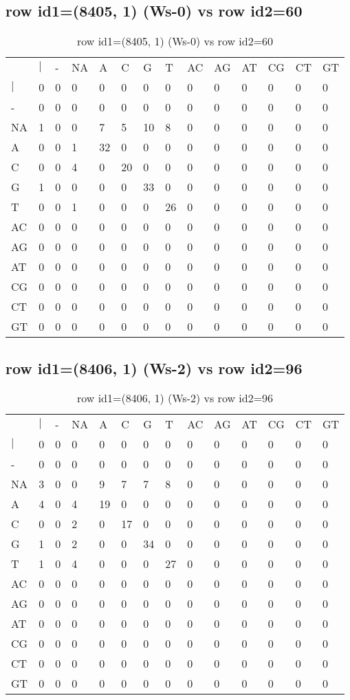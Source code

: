 \subsection{row id1=(8405, 1) (Ws-0) vs row id2=60}
\begin{center}
\begin{longtable}{|l|l|l|l|l|l|l|l|l|l|l|l|l|l|}
\caption{row id1=(8405, 1) (Ws-0) vs row id2=60} \label{table_dm478}\\
\hline
\\
\hline
&$|$&-&NA&A&C&G&T&AC&AG&AT&CG&CT&GT\\
$|$&0&0&0&0&0&0&0&0&0&0&0&0&0\\
-&0&0&0&0&0&0&0&0&0&0&0&0&0\\
NA&1&0&0&7&5&10&8&0&0&0&0&0&0\\
A&0&0&1&32&0&0&0&0&0&0&0&0&0\\
C&0&0&4&0&20&0&0&0&0&0&0&0&0\\
G&1&0&0&0&0&33&0&0&0&0&0&0&0\\
T&0&0&1&0&0&0&26&0&0&0&0&0&0\\
AC&0&0&0&0&0&0&0&0&0&0&0&0&0\\
AG&0&0&0&0&0&0&0&0&0&0&0&0&0\\
AT&0&0&0&0&0&0&0&0&0&0&0&0&0\\
CG&0&0&0&0&0&0&0&0&0&0&0&0&0\\
CT&0&0&0&0&0&0&0&0&0&0&0&0&0\\
GT&0&0&0&0&0&0&0&0&0&0&0&0&0\\
\hline
\end{longtable}
\end{center}

\subsection{row id1=(8406, 1) (Ws-2) vs row id2=96}
\begin{center}
\begin{longtable}{|l|l|l|l|l|l|l|l|l|l|l|l|l|l|}
\caption{row id1=(8406, 1) (Ws-2) vs row id2=96} \label{table_dm480}\\
\hline
\\
\hline
&$|$&-&NA&A&C&G&T&AC&AG&AT&CG&CT&GT\\
$|$&0&0&0&0&0&0&0&0&0&0&0&0&0\\
-&0&0&0&0&0&0&0&0&0&0&0&0&0\\
NA&3&0&0&9&7&7&8&0&0&0&0&0&0\\
A&4&0&4&19&0&0&0&0&0&0&0&0&0\\
C&0&0&2&0&17&0&0&0&0&0&0&0&0\\
G&1&0&2&0&0&34&0&0&0&0&0&0&0\\
T&1&0&4&0&0&0&27&0&0&0&0&0&0\\
AC&0&0&0&0&0&0&0&0&0&0&0&0&0\\
AG&0&0&0&0&0&0&0&0&0&0&0&0&0\\
AT&0&0&0&0&0&0&0&0&0&0&0&0&0\\
CG&0&0&0&0&0&0&0&0&0&0&0&0&0\\
CT&0&0&0&0&0&0&0&0&0&0&0&0&0\\
GT&0&0&0&0&0&0&0&0&0&0&0&0&0\\
\hline
\end{longtable}
\end{center}

